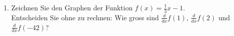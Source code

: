 \begin{enumerate}
          \begin{enumerate}
              \item Berechnen Sie \( f'(0) \). Welche Eigenschaft des Graphen wird durch das Resultat verdeutlicht?
              \item Berechnen Sie \( f'(2) \).
              \item Bestimmen Sie \( f'(-2) \) ohne zu rechnen, indem Sie die Symmetrie der Parabel verwenden.
          \end{enumerate}

    \item Zeichnen Sie den Graphen der Funktion \( f(x) = \frac{1}{3}x - 1 \).\\
          Entscheiden Sie ohne zu rechnen: Wie gross sind \( \frac{d}{dx} f(1) \), \( \frac{d}{dx} f(2) \) und \( \frac{d}{dx} f(-42) \)?




\end{enumerate}

